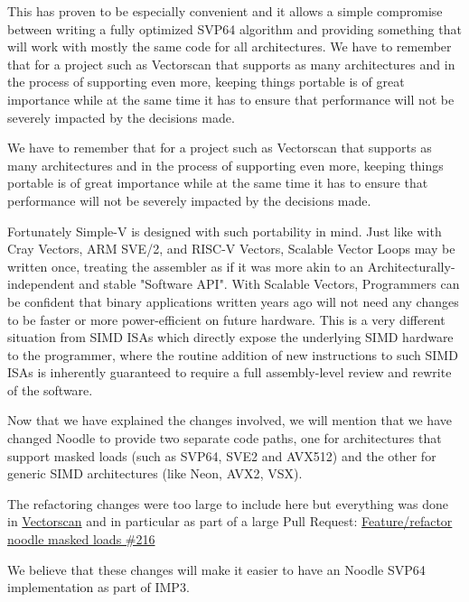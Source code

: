 This has proven to be especially convenient and it allows a simple compromise between writing a fully optimized \acrshort{SVP64} algorithm
and providing something that will work with mostly the same code for all architectures.
We have to remember that for a project such as Vectorscan that supports as many architectures
and in the process of supporting even more, keeping things portable is of great importance
while at the same time it has to ensure that performance will not be severely impacted by the decisions made.
\par

We have to remember that for a project such as Vectorscan that supports as
many architectures and in the process of supporting even more, keeping
things portable is of great importance while at the same time it has
to ensure that performance will not be severely impacted
by the decisions made. \par

Fortunately Simple-V is designed with such portability in mind. Just like
with Cray Vectors, ARM SVE/2, and RISC-V Vectors, Scalable Vector Loops
may be written once, treating the assembler as if it was more
akin to an Architecturally-independent and stable "Software API".
With Scalable Vectors, Programmers can be confident
that binary applications written years ago will not need any changes
to be faster or more power-efficient on future hardware. This is a very
different situation from SIMD ISAs which directly expose the
underlying SIMD hardware to the programmer, where the routine addition
of new instructions to such SIMD ISAs is inherently guaranteed to require
a full assembly-level review and rewrite of the software. \par

Now that we have explained the changes involved, we will mention that we have changed Noodle to provide two separate code paths,
one for architectures that support masked loads (such as \acrshort{SVP64}, \acrshort{SVE2} and \acrshort{AVX512})
and the other for generic \acrshort{SIMD} architectures (like Neon, \acrshort{AVX2}, \acrshort{VSX}).
\par

The refactoring changes were too large to include here
but everything was done in \href{https://github.com/VectorCamp/vectorscan}{Vectorscan} and in particular as part of a large Pull Request:
\href{https://github.com/VectorCamp/vectorscan/pull/216}{Feature/refactor noodle masked loads \#216}
\par

We believe that these changes will make it easier to have an Noodle \acrshort{SVP64} implementation as part of \acrshort{IMP}3.
\par
